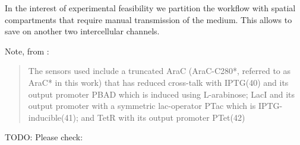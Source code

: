 \documentclass[12pt,notitlepage]{article}
\newcommand{\TODO}[1]{\textrm{\color{red}TODO: #1}}
\newcommand{\ra}[1]{{\color{Blue}#1}}
\begin{document}
In the interest of experimental feasibility
we partition the workflow
with spatial compartments
that require manual transmission of 
the medium.
%
%
This allows to save on another two intercellular channels.
%
%
%

\ra{Note, from \cite[SM, VII.M]{NielsenETAL2016}:
\begin{quote}
    The sensors used include a truncated AraC 
    (AraC-C280*, referred to as AraC* in this work)
    that has reduced cross-talk with IPTG(40) and its output promoter PBAD
    which is induced using L-arabinose; 
    LacI and its output promoter with a symmetric lac-operator PTac which
    is IPTG-inducible(41); 
    and TetR with its output promoter PTet(42)
\end{quote}
}

\TODO{Please check:}
\end{document}
